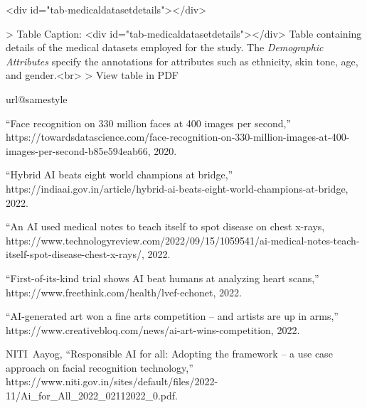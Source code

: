 \documentclass[journal]{IEEEtran}
\begin{document}
\begin{table}<div id="tab-medicaldatasetdetails"></div>

> Table Caption: <div id="tab-medicaldatasetdetails"></div>
Table containing details of the medical datasets employed for the study. The \textit{Demographic Attributes} specify the annotations for attributes such as ethnicity, skin tone, age, and gender.<br>
> View table in PDF
\end{table}
\begin{thebibliography}{100}
\providecommand{\url}[1]{#1}
\csname url@samestyle\endcsname
\providecommand{\newblock}{\relax}
\providecommand{\bibinfo}[2]{#2}
\providecommand{\BIBentrySTDinterwordspacing}{\spaceskip=0pt\relax}
\providecommand{\BIBentryALTinterwordstretchfactor}{4}
\providecommand{\BIBentryALTinterwordspacing}{\spaceskip=\fontdimen2\font plus
\BIBentryALTinterwordstretchfactor\fontdimen3\font minus
\fontdimen4\font\relax}
\providecommand{\BIBforeignlanguage}[2]{{
\expandafter\ifx\csname l@#1\endcsname\relax
\typeout{** WARNING: IEEEtran.bst: No hyphenation pattern has been}
\typeout{** loaded for the language `#1'. Using the pattern for}
\typeout{** the default language instead.}
\else
\language=\csname l@#1\endcsname
\fi
#2}}
\providecommand{\BIBdecl}{\relax}
\BIBdecl

``Face recognition on 330 million faces at 400 images per second,''
\url{https://towardsdatascience.com/face-recognition-on-330-million-images-at-400-images-per-second-b85e594eab66},
2020.

``Hybrid AI beats eight world champions at bridge,''
\url{https://indiaai.gov.in/article/hybrid-ai-beats-eight-world-champions-at-bridge},
2022.

``An AI used medical notes to teach itself to spot disease on chest x-rays, \url{https://www.technologyreview.com/2022/09/15/1059541/ai-medical-notes-teach-itself-spot-disease-chest-x-rays/},
2022.

``First-of-its-kind trial shows AI beat humans at analyzing heart scans,''
\url{https://www.freethink.com/health/lvef-echonet}, 2022.

``AI-generated art won a fine arts competition – and artists are up in
arms,'' \url{https://www.creativebloq.com/news/ai-art-wins-competition},
2022.

\relax NITI~Aayog, ``Responsible AI for all: Adopting the framework – a use case approach on facial recognition technology,''
\url{https://www.niti.gov.in/sites/default/files/2022-11/Ai_for_All_2022_02112022_0.pdf}.


\end{thebibliography}
\end{document}
